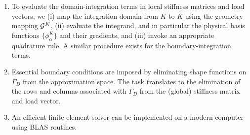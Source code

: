\begin{enumerate}
\item To evaluate the domain-integration terms in local stiffness matrices and load vectors, we (i) map the integration domain from $K$ to $\tilde K$ using the geometry mapping $\mathcal{G}^K$, (ii) evaluate the integrand, and in particular the physical basis functions $\{\phi_\alpha^K\}$ and their gradients, and (iii) invoke an appropriate quadrature rule.  A similar procedure exists for the boundary-integration terms.
\item Essential boundary conditions are imposed by eliminating shape functions on $\bar \Gamma_D$ from the approximation space. The task translates to the elimination of the rows and columns associated with $\bar \Gamma_D$ from the (global) stiffness matrix and load vector.
\item An efficient finite element solver can be implemented on a modern computer using BLAS routines.
\end{enumerate}













